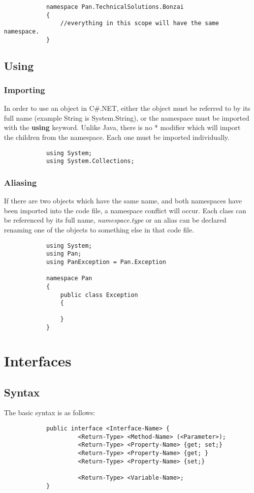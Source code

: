 \documentclass {amsart}
\begin{document}
		\begin{lstlisting}
			namespace Pan.TechnicalSolutions.Bonzai
			{
				//everything in this scope will have the same namespace.  
			}
		\end{lstlisting}

	\subsection {Using}
		\subsubsection {Importing}  In order to use an object in C\#.NET, either the object must be referred to by its full name (example String is System.String), or the namespace must be imported with the {\bf using} keyword.  Unlike Java, there is no * modifier which will import the children from the namespace.  Each one must be imported individually. 
		\begin{lstlisting}
			using System;
			using System.Collections;
		\end{lstlisting}

		\subsubsection {Aliasing} If there are two objects which have the same name, and both namespaces have been imported into the code file, a namespace conflict will occur.  Each class can be referenced by its full name, \emph{namespace.type} or an alias can be declared renaming one of the objects to something else in that code file.  
		\begin{lstlisting}
			using System;
			using Pan;
			using PanException = Pan.Exception

			namespace Pan
			{
				public class Exception
				{
	
				}
			}
		\end{lstlisting}

\section{Interfaces}
	\subsection{Syntax} The basic syntax is as follows: 
		\begin{verbatim}
			public interface <Interface-Name> {
				     <Return-Type> <Method-Name> (<Parameter>);
				     <Return-Type> <Property-Name> {get; set;}
				     <Return-Type> <Property-Name> {get; }
				     <Return-Type> <Property-Name> {set;}

				     <Return-Type> <Variable-Name>;
			}
		\end{verbatim} 
\end{document}
